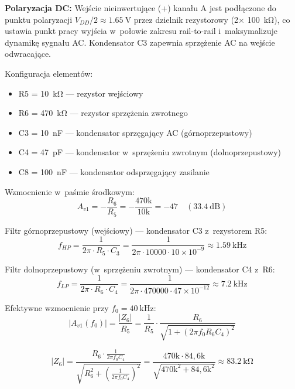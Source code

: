 \documentclass[a4paper,11pt]{article}
\begin{document}
\textbf{Polaryzacja DC:} Wejście nieinwertujące (+) kanału A jest podłączone
do punktu polaryzacji $V_{DD}/2 \approx \SI{1,65}{\volt}$ przez dzielnik
rezystorowy (2$\times$ \SI{100}{\kilo\ohm}), co ustawia punkt pracy wyjścia
w~połowie zakresu rail-to-rail i~maksymalizuje dynamikę sygnału AC.
Kondensator C3 zapewnia sprzężenie AC na wejście odwracające.

Konfiguracja elementów:
\begin{itemize}[nosep]
    \item R5 = \SI{10}{\kilo\ohm} --- rezystor wejściowy
    \item R6 = \SI{470}{\kilo\ohm} --- rezystor sprzężenia zwrotnego
    \item C3 = \SI{10}{\nano\farad} --- kondensator sprzęgający AC (górnoprzepustowy)
    \item C4 = \SI{47}{\pico\farad} --- kondensator w~sprzężeniu zwrotnym (dolnoprzepustowy)
    \item C8 = \SI{100}{\nano\farad} --- kondensator odsprzęgający zasilanie
\end{itemize}

Wzmocnienie w~paśmie środkowym:
\begin{equation}
    A_{v1} = -\frac{R_6}{R_5} = -\frac{470\text{k}}{10\text{k}} = -47 \quad (\SI{33,4}{\deci\bel})
    \label{eq:gain1}
\end{equation}

Filtr górnoprzepustowy (wejściowy) --- kondensator C3 z~rezystorem R5:
\begin{equation}
    f_{HP} = \frac{1}{2\pi \cdot R_5 \cdot C_3} = \frac{1}{2\pi \cdot 10000 \cdot 10 \times 10^{-9}} \approx \SI{1,59}{\kilo\hertz}
    \label{eq:fhp}
\end{equation}

Filtr dolnoprzepustowy (w~sprzężeniu zwrotnym) --- kondensator C4 z~R6:
\begin{equation}
    f_{LP} = \frac{1}{2\pi \cdot R_6 \cdot C_4} = \frac{1}{2\pi \cdot 470000 \cdot 47 \times 10^{-12}} \approx \SI{7,2}{\kilo\hertz}
    \label{eq:flp_raw}
\end{equation}

Efektywne wzmocnienie przy $f_0 = \SI{40}{\kilo\hertz}$:
\begin{equation}
    |A_{v1}(f_0)| = \frac{|Z_6|}{R_5} = \frac{1}{R_5} \cdot \frac{R_6}{\sqrt{1 + (2\pi f_0 R_6 C_4)^2}}
    \label{eq:gain1_f0}
\end{equation}

\begin{equation}
    |Z_6| = \frac{R_6 \cdot \frac{1}{2\pi f_0 C_4}}{\sqrt{R_6^2 + \left(\frac{1}{2\pi f_0 C_4}\right)^2}}
    = \frac{470\text{k} \cdot 84{,}6\text{k}}{\sqrt{470\text{k}^2 + 84{,}6\text{k}^2}} \approx \SI{83,2}{\kilo\ohm}
    \label{eq:z6}
\end{equation}
\end{document}

